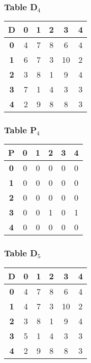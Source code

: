 \documentclass{beamer}
\begin{document}
\begin{frame}
\frametitle{Table D$_{4}$}
\begin{center}
    \begin{tabular}{|c||c|c|c|c|c|}
        \hline
        \textbf{D} & \textbf{0} & \textbf{1} & \textbf{2} & \textbf{3} & \textbf{4} \\
        \hline
        \hline
        \textbf{0}& 4 & 7 & 8 & 6 & 4 \\
        \hline
        \textbf{1}& 6 & 7 & 3 & 10 & 2 \\
        \hline
        \textbf{2}& 3 & 8 & 1 & 9 & 4 \\
        \hline
        \textbf{3}& 7 & 1 & 4 & 3 & 3 \\
        \hline
        \textbf{4}& 2 & 9 & 8 & 8 & 3 \\
        \hline
    \end{tabular}
\end{center}


\end{frame}


\begin{frame}
\frametitle{Table P$_{4}$}
\begin{center}
    \begin{tabular}{|c||c|c|c|c|c|}
        \hline
        \textbf{P} & \textbf{0} & \textbf{1} & \textbf{2} & \textbf{3} & \textbf{4} \\
        \hline
        \hline
        \textbf{0}& 0 & 0 & 0 & 0 & 0 \\
        \hline
        \textbf{1}& 0 & 0 & 0 & 0 & 0 \\
        \hline
        \textbf{2}& 0 & 0 & 0 & 0 & 0 \\
        \hline
        \textbf{3}& 0 & 0 & 1 & 0 & 1 \\
        \hline
        \textbf{4}& 0 & 0 & 0 & 0 & 0 \\
        \hline
    \end{tabular}
\end{center}


\end{frame}


\begin{frame}
\frametitle{Table D$_{5}$}
\begin{center}
    \begin{tabular}{|c||c|c|c|c|c|}
        \hline
        \textbf{D} & \textbf{0} & \textbf{1} & \textbf{2} & \textbf{3} & \textbf{4} \\
        \hline
        \hline
        \textbf{0}& 4 & 7 & 8 & 6 & 4 \\
        \hline
        \textbf{1}& \cellcolor{yellow}4 & 7 & 3 & 10 & 2 \\
        \hline
        \textbf{2}& 3 & 8 & 1 & 9 & 4 \\
        \hline
        \textbf{3}& \cellcolor{yellow}5 & 1 & 4 & 3 & 3 \\
        \hline
        \textbf{4}& 2 & 9 & 8 & 8 & 3 \\
        \hline
    \end{tabular}
\end{center}


\end{frame}
\end{document}
